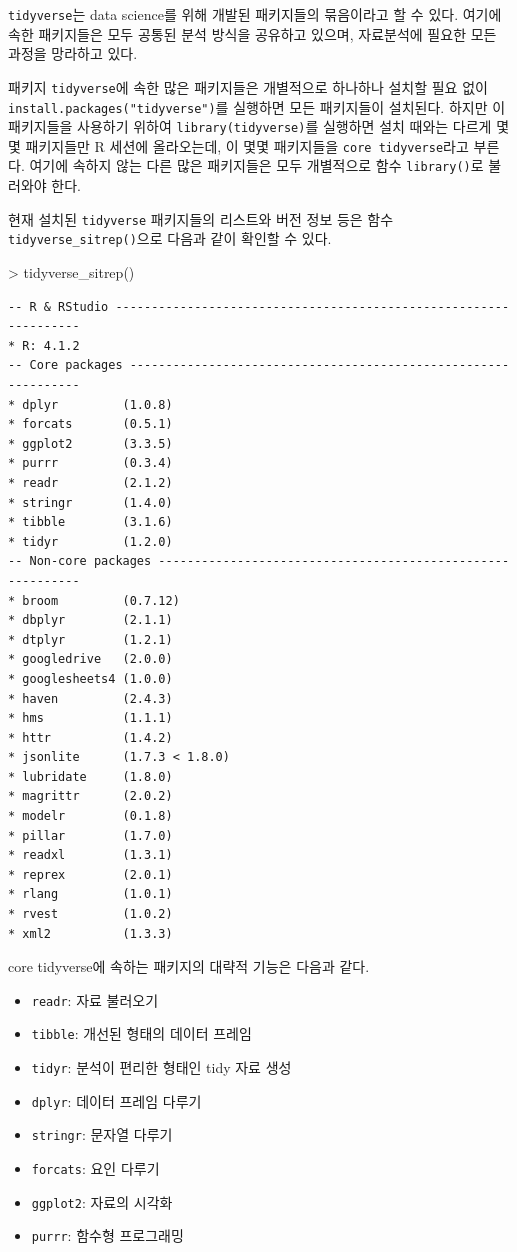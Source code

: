 \documentclass[
]{book}
\newenvironment{Shaded}{\begin{snugshade}}{\end{snugshade}}
\newcommand{\FunctionTok}[1]{\textcolor[rgb]{0.00,0.00,0.00}{#1}}
\newcommand{\NormalTok}[1]{#1}
\newcommand{\SpecialCharTok}[1]{\textcolor[rgb]{0.00,0.00,0.00}{#1}}
\begin{document}
\texttt{tidyverse}는 data science를 위해 개발된 패키지들의 묶음이라고 할 수 있다.
여기에 속한 패키지들은 모두 공통된 분석 방식을 공유하고 있으며,
자료분석에 필요한 모든 과정을 망라하고 있다.

패키지 \texttt{tidyverse}에 속한 많은 패키지들은 개별적으로 하나하나 설치할 필요
없이 \texttt{install.packages("tidyverse")}를 실행하면 모든 패키지들이
설치된다. 하지만 이 패키지들을 사용하기 위하여 \texttt{library(tidyverse)}를
실행하면 설치 때와는 다르게 몇몇 패키지들만 R 세션에 올라오는데, 이 몇몇
패키지들을 \texttt{core\ tidyverse}라고 부른다. 여기에 속하지 않는 다른 많은
패키지들은 모두 개별적으로 함수 \texttt{library()}로 불러와야 한다.

현재 설치된 \texttt{tidyverse} 패키지들의 리스트와 버전 정보 등은 함수 \texttt{tidyverse\_sitrep()}으로 다음과 같이
확인할 수 있다.

\begin{Shaded}
\begin{Highlighting}[]
\SpecialCharTok{\textgreater{}} \FunctionTok{tidyverse\_sitrep}\NormalTok{()}
\end{Highlighting}
\end{Shaded}

\begin{verbatim}
-- R & RStudio -----------------------------------------------------------------
* R: 4.1.2
-- Core packages ---------------------------------------------------------------
* dplyr         (1.0.8)
* forcats       (0.5.1)
* ggplot2       (3.3.5)
* purrr         (0.3.4)
* readr         (2.1.2)
* stringr       (1.4.0)
* tibble        (3.1.6)
* tidyr         (1.2.0)
-- Non-core packages -----------------------------------------------------------
* broom         (0.7.12)
* dbplyr        (2.1.1)
* dtplyr        (1.2.1)
* googledrive   (2.0.0)
* googlesheets4 (1.0.0)
* haven         (2.4.3)
* hms           (1.1.1)
* httr          (1.4.2)
* jsonlite      (1.7.3 < 1.8.0)
* lubridate     (1.8.0)
* magrittr      (2.0.2)
* modelr        (0.1.8)
* pillar        (1.7.0)
* readxl        (1.3.1)
* reprex        (2.0.1)
* rlang         (1.0.1)
* rvest         (1.0.2)
* xml2          (1.3.3)
\end{verbatim}

core tidyverse에 속하는 패키지의 대략적 기능은 다음과 같다.

\begin{itemize}
\item
  \texttt{readr}: 자료 불러오기
\item
  \texttt{tibble}: 개선된 형태의 데이터 프레임
\item
  \texttt{tidyr}: 분석이 편리한 형태인 tidy 자료 생성
\item
  \texttt{dplyr}: 데이터 프레임 다루기
\item
  \texttt{stringr}: 문자열 다루기
\item
  \texttt{forcats}: 요인 다루기
\item
  \texttt{ggplot2}: 자료의 시각화
\item
  \texttt{purrr}: 함수형 프로그래밍
\end{itemize}
\end{document}
